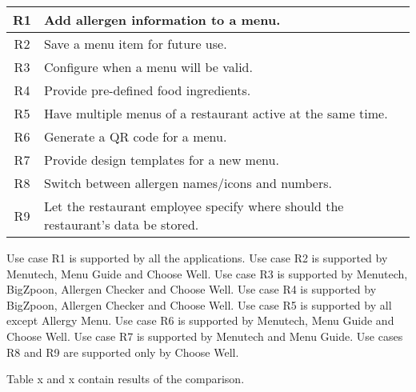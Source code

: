 \begin{center}
  \begin{tabular}{| c | l |}
    \hline
    R1 & Add allergen information to a menu. \\
    \hline
    R2 & Save a menu item for future use. \\
    \hline
    R3 & Configure when a menu will be valid. \\
    \hline
    R4 & Provide pre-defined food ingredients. \\
    \hline
    R5 & Have multiple menus of a restaurant active at the same time. \\    
    \hline
    R6 & Generate a QR code for a menu. \\
    \hline 
    R7 & Provide design templates for a new menu. \\
    \hline 
    R8 & Switch between allergen names/icons and numbers. \\
    \hline 
    R9 & Let the restaurant employee specify where should the restaurant's data be stored. \\
    \hline
  \end{tabular}
  \newline
\end{center}

Use case R1 is supported by all the applications.
Use case R2 is supported by Menutech, Menu Guide and Choose Well.
Use case R3 is supported by Menutech, BigZpoon, Allergen Checker and Choose Well.
Use case R4 is supported by BigZpoon, Allergen Checker and Choose Well.
Use case R5 is supported by all except Allergy Menu.
Use case R6 is supported by Menutech, Menu Guide and Choose Well.
Use case R7 is supported by Menutech and Menu Guide.
Use cases R8 and R9 are supported only by Choose Well.


Table x and x contain results of the comparison.

